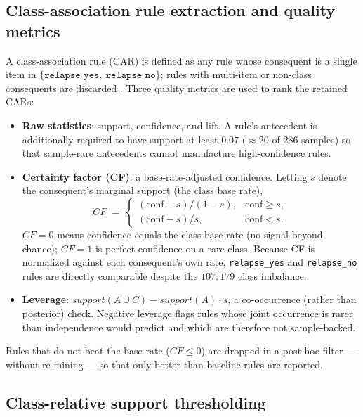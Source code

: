 \documentclass[twocolumn]{article}
\begin{document}
\subsection{Class-association rule extraction and quality metrics}
\label{sec:method-cf}

A class-association rule (CAR) is defined as any rule whose consequent is a
single item in $\{\texttt{relapse\_yes},\ \texttt{relapse\_no}\}$; rules with
multi-item or non-class consequents are discarded \citep{liu1998integrating}.
Three quality metrics are used to rank the retained CARs:

\begin{itemize}
    \item \textbf{Raw statistics}: support, confidence, and lift. A rule's
    antecedent is additionally required to have support at least $0.07$
    ($\approx$20 of 286 samples) so that sample-rare antecedents cannot
    manufacture high-confidence rules.
    \item \textbf{Certainty factor (CF)}: a base-rate-adjusted confidence.
    Letting $s$ denote the consequent's marginal support (the class base
    rate),
    \[
    \mathit{CF} \;=\; \begin{cases}
        (\mathrm{conf} - s)/(1 - s), & \mathrm{conf} \ge s, \\
        (\mathrm{conf} - s)/s,       & \mathrm{conf} < s.
    \end{cases}
    \]
    $\mathit{CF} = 0$ means confidence equals the class base rate (no signal
    beyond chance); $\mathit{CF} = 1$ is perfect confidence on a rare class.
    Because CF is normalized against each consequent's own rate,
    \texttt{relapse\_yes} and \texttt{relapse\_no} rules are directly
    comparable despite the $107{:}179$ class imbalance.
    \item \textbf{Leverage}: $\mathit{support}(A \cup C)
    - \mathit{support}(A)\cdot s$, a co-occurrence (rather than posterior)
    check. Negative leverage flags rules whose joint occurrence is rarer than
    independence would predict and which are therefore not sample-backed.
\end{itemize}

Rules that do not beat the base rate ($\mathit{CF} \le 0$) are dropped in a
post-hoc filter --- without re-mining --- so that only better-than-baseline
rules are reported.

\subsection{Class-relative support thresholding}
\label{sec:method-classrel}
\end{document}
